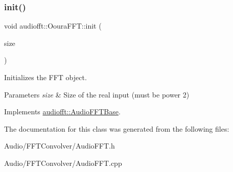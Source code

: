 \subsubsection{\texorpdfstring{init()}{init()}}
{\footnotesize\ttfamily void audiofft\+::\+Ooura\+F\+F\+T\+::init (\begin{DoxyParamCaption}\item[{size\+\_\+t}]{size }\end{DoxyParamCaption})\hspace{0.3cm}{\ttfamily [virtual]}}



Initializes the F\+FT object. 


\begin{DoxyParams}{Parameters}
{\em size} & Size of the real input (must be power 2) \\
\hline
\end{DoxyParams}


Implements \hyperlink{classaudiofft_1_1_audio_f_f_t_base_a32447c362c9c78c570c5117762b190d4}{audiofft\+::\+Audio\+F\+F\+T\+Base}.



The documentation for this class was generated from the following files\+:\begin{DoxyCompactItemize}
\item 
Audio/\+F\+F\+T\+Convolver/Audio\+F\+F\+T.\+h\item 
Audio/\+F\+F\+T\+Convolver/Audio\+F\+F\+T.\+cpp\end{DoxyCompactItemize}
